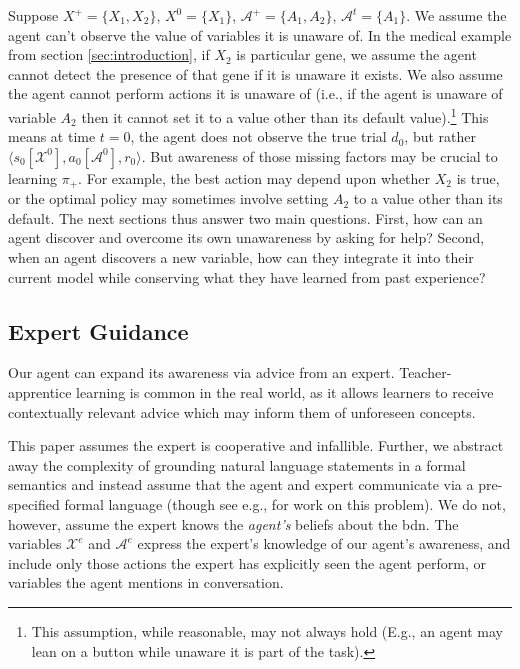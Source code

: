\documentclass{article}
\newcommand{\bdn}{{\sc bdn}}
\begin{document}
	Suppose $X^+ = \{ X_1, X_2\}$, $X^0 = \{ X_1 \}$, $\mathcal{A}^+ = \{ A_1, A_2 \}$, $\mathcal{A}^t = \{ A_1 \}$. We assume the agent can't observe the value of variables it is unaware of. In the medical example from section \ref{sec:introduction}, if $X_2$ is particular gene, we assume the agent cannot detect the presence of that gene if it is unaware it exists. We also assume the agent cannot perform actions it is unaware of (i.e., if the agent is unaware of variable $A_2$ then it cannot set it to a value other than its default value).\footnote{This assumption, while reasonable, may not always hold (E.g., an agent may lean on a button while unaware it is part of the task).} This means at time $t=0$, the agent does not observe the true trial $d_0$, but rather $\langle s_0[\mathcal{X}^0], a_0[\mathcal{A}^0], r_0 \rangle$. But awareness of those missing factors may be crucial to learning $\pi_+$. For example, the best action may depend upon whether $X_2$ is true, or the optimal policy may sometimes involve setting $A_2$ to a value other than its default. The next sections thus answer two main questions. First, how can an agent discover and overcome its own unawareness by asking for help? Second, when an agent discovers a new variable, how can they integrate it into their current model while conserving what they have learned from past experience?

	\subsection{Expert Guidance}
	\label{sec:expert-guidance}
	Our agent can expand its awareness via advice from an expert. Teacher-apprentice learning is common in the real world, as it allows learners to receive contextually relevant advice which may inform them of unforeseen concepts.
	
	This paper assumes the expert is cooperative and infallible. Further, we abstract away the complexity of grounding natural language statements in a formal semantics and instead assume that the agent and expert communicate via a pre-specified formal language (though see e.g., \cite{zettlemoyer_online_2007} for work on this problem). We do not, however, assume the expert knows the \emph{agent's} beliefs about the \bdn{}. The variables $\mathcal{X}^e$ and $\mathcal{A}^e$ express the expert's knowledge of our agent's awareness, and include only those actions  the expert has explicitly seen the agent perform, or variables the agent mentions in conversation.
	
\end{document}
